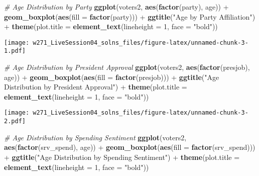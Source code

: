 \documentclass[]{article}
\newenvironment{Shaded}{\begin{snugshade}}{\end{snugshade}}
\newcommand{\KeywordTok}[1]{\textcolor[rgb]{0.13,0.29,0.53}{\textbf{{#1}}}}
\newcommand{\DataTypeTok}[1]{\textcolor[rgb]{0.13,0.29,0.53}{{#1}}}
\newcommand{\DecValTok}[1]{\textcolor[rgb]{0.00,0.00,0.81}{{#1}}}
\newcommand{\StringTok}[1]{\textcolor[rgb]{0.31,0.60,0.02}{{#1}}}
\newcommand{\CommentTok}[1]{\textcolor[rgb]{0.56,0.35,0.01}{\textit{{#1}}}}
\newcommand{\NormalTok}[1]{{#1}}
\begin{document}
\begin{Shaded}
\begin{Highlighting}[]
\CommentTok{# Age Distribution by Party}
\KeywordTok{ggplot}\NormalTok{(voters2, }\KeywordTok{aes}\NormalTok{(}\KeywordTok{factor}\NormalTok{(party), age)) +}\StringTok{ }\KeywordTok{geom_boxplot}\NormalTok{(}\KeywordTok{aes}\NormalTok{(}\DataTypeTok{fill =} \KeywordTok{factor}\NormalTok{(party))) +}\StringTok{ }
\StringTok{    }\KeywordTok{ggtitle}\NormalTok{(}\StringTok{"Age by Party Affiliation"}\NormalTok{) +}\StringTok{ }\KeywordTok{theme}\NormalTok{(}\DataTypeTok{plot.title =} \KeywordTok{element_text}\NormalTok{(}\DataTypeTok{lineheight =} \DecValTok{1}\NormalTok{, }
    \DataTypeTok{face =} \StringTok{"bold"}\NormalTok{))}
\end{Highlighting}
\end{Shaded}

\texttt{[image: w271\_LiveSession04\_solns\_files/figure-latex/unnamed-chunk-3-1.pdf]}

\begin{Shaded}
\begin{Highlighting}[]
\CommentTok{# Age Distribution by President Approval}
\KeywordTok{ggplot}\NormalTok{(voters2, }\KeywordTok{aes}\NormalTok{(}\KeywordTok{factor}\NormalTok{(presjob), age)) +}\StringTok{ }\KeywordTok{geom_boxplot}\NormalTok{(}\KeywordTok{aes}\NormalTok{(}\DataTypeTok{fill =} \KeywordTok{factor}\NormalTok{(presjob))) +}\StringTok{ }
\StringTok{    }\KeywordTok{ggtitle}\NormalTok{(}\StringTok{"Age Distribution by President Approval"}\NormalTok{) +}\StringTok{ }\KeywordTok{theme}\NormalTok{(}\DataTypeTok{plot.title =} \KeywordTok{element_text}\NormalTok{(}\DataTypeTok{lineheight =} \DecValTok{1}\NormalTok{, }
    \DataTypeTok{face =} \StringTok{"bold"}\NormalTok{))}
\end{Highlighting}
\end{Shaded}

\texttt{[image: w271\_LiveSession04\_solns\_files/figure-latex/unnamed-chunk-3-2.pdf]}

\begin{Shaded}
\begin{Highlighting}[]
\CommentTok{# Age Distribution by Spending Sentiment}
\KeywordTok{ggplot}\NormalTok{(voters2, }\KeywordTok{aes}\NormalTok{(}\KeywordTok{factor}\NormalTok{(srv_spend), age)) +}\StringTok{ }\KeywordTok{geom_boxplot}\NormalTok{(}\KeywordTok{aes}\NormalTok{(}\DataTypeTok{fill =} \KeywordTok{factor}\NormalTok{(srv_spend))) +}\StringTok{ }
\StringTok{    }\KeywordTok{ggtitle}\NormalTok{(}\StringTok{"Age Distribution by Spending Sentiment"}\NormalTok{) +}\StringTok{ }\KeywordTok{theme}\NormalTok{(}\DataTypeTok{plot.title =} \KeywordTok{element_text}\NormalTok{(}\DataTypeTok{lineheight =} \DecValTok{1}\NormalTok{, }
    \DataTypeTok{face =} \StringTok{"bold"}\NormalTok{))}
\end{Highlighting}
\end{Shaded}
\end{document}
